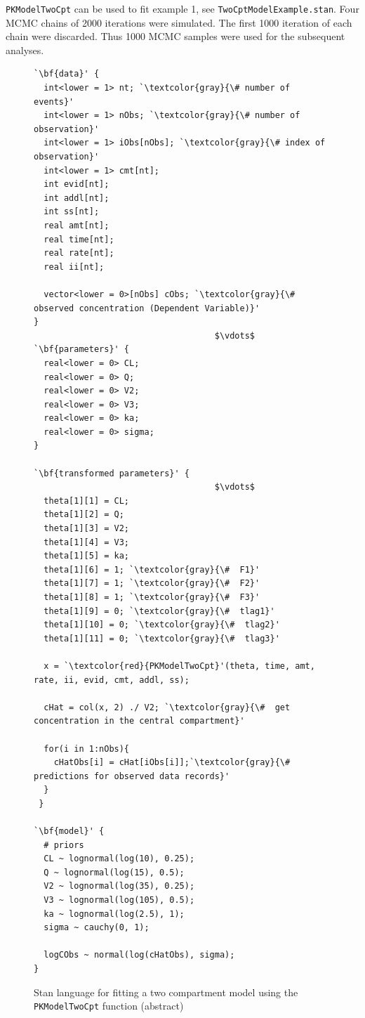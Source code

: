 \documentclass[11pt]{amsart}
\newenvironment{fmpage}[1]
     {\begin{lrbox}{\fmbox}\begin{minipage}{#1}}
     {\end{minipage}\end{lrbox}\fbox{\usebox{\fmbox}}}
\begin{document}
\texttt{PKModelTwoCpt} can be used to fit example 1, see \texttt{TwoCptModelExample.stan}. Four MCMC chains of 2000 iterations were simulated. The first 1000 iteration of each chain were discarded. Thus 1000 MCMC samples were used for the subsequent analyses.

\begin{figure}
\caption{Stan language for fitting a two compartment model using the \texttt{PKModelTwoCpt} function (abstract)}
\begin{center}
\begin{small}
\begin{fmpage}{\textwidth - .75in}
\begin{lstlisting}[basicstyle=\footnotesize\ttfamily,mathescape=true,flexiblecolumns=true,frame=single,escapeinside=`']
`\bf{data}' {
  int<lower = 1> nt; `\textcolor{gray}{\# number of events}'
  int<lower = 1> nObs; `\textcolor{gray}{\# number of observation}'
  int<lower = 1> iObs[nObs]; `\textcolor{gray}{\# index of observation}'
  int<lower = 1> cmt[nt];
  int evid[nt];
  int addl[nt];
  int ss[nt];
  real amt[nt];
  real time[nt];
  real rate[nt];
  real ii[nt];
  
  vector<lower = 0>[nObs] cObs; `\textcolor{gray}{\#  observed concentration (Dependent Variable)}'
}
                                    $\vdots$ 
`\bf{parameters}' {
  real<lower = 0> CL;
  real<lower = 0> Q;
  real<lower = 0> V2;
  real<lower = 0> V3;
  real<lower = 0> ka;
  real<lower = 0> sigma;
}

`\bf{transformed parameters}' {
                                    $\vdots$ 
  theta[1][1] = CL;
  theta[1][2] = Q;
  theta[1][3] = V2;
  theta[1][4] = V3;
  theta[1][5] = ka;
  theta[1][6] = 1; `\textcolor{gray}{\#  F1}'
  theta[1][7] = 1; `\textcolor{gray}{\#  F2}'
  theta[1][8] = 1; `\textcolor{gray}{\#  F3}'
  theta[1][9] = 0; `\textcolor{gray}{\#  tlag1}'
  theta[1][10] = 0; `\textcolor{gray}{\#  tlag2}'
  theta[1][11] = 0; `\textcolor{gray}{\#  tlag3}'

  x = `\textcolor{red}{PKModelTwoCpt}'(theta, time, amt, rate, ii, evid, cmt, addl, ss);

  cHat = col(x, 2) ./ V2; `\textcolor{gray}{\#  get concentration in the central compartment}'

  for(i in 1:nObs){
    cHatObs[i] = cHat[iObs[i]];`\textcolor{gray}{\# predictions for observed data records}'
  }
 }

`\bf{model}' {
  # priors
  CL ~ lognormal(log(10), 0.25);
  Q ~ lognormal(log(15), 0.5);
  V2 ~ lognormal(log(35), 0.25);
  V3 ~ lognormal(log(105), 0.5);
  ka ~ lognormal(log(2.5), 1);
  sigma ~ cauchy(0, 1);

  logCObs ~ normal(log(cHatObs), sigma);
}                                             
\end{lstlisting}
\end{fmpage}
\end{small}
\end{center}
\label{example1.1Model}
\end{figure}
\end{document}
